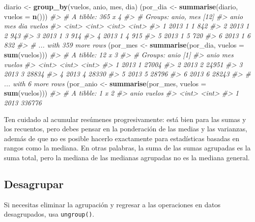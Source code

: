\documentclass[11pt,oneside]{report}
\newenvironment{Shaded}{\begin{snugshade}}{\end{snugshade}}
\newcommand{\CommentTok}[1]{\textcolor[rgb]{0.56,0.35,0.01}{\textit{#1}}}
\newcommand{\DataTypeTok}[1]{\textcolor[rgb]{0.13,0.29,0.53}{#1}}
\newcommand{\KeywordTok}[1]{\textcolor[rgb]{0.13,0.29,0.53}{\textbf{#1}}}
\newcommand{\NormalTok}[1]{#1}
\newcommand{\StringTok}[1]{\textcolor[rgb]{0.31,0.60,0.02}{#1}}
\begin{document}
\begin{Shaded}
\begin{Highlighting}[]
\NormalTok{diario <-}\StringTok{ }\KeywordTok{group_by}\NormalTok{(vuelos, anio, mes, dia)}
\NormalTok{(por_dia   <-}\StringTok{ }\KeywordTok{summarise}\NormalTok{(diario, }\DataTypeTok{vuelos =} \KeywordTok{n}\NormalTok{()))}
\CommentTok{#> # A tibble: 365 x 4}
\CommentTok{#> # Groups:   anio, mes [12]}
\CommentTok{#>    anio   mes   dia vuelos}
\CommentTok{#>   <int> <int> <int>  <int>}
\CommentTok{#> 1  2013     1     1    842}
\CommentTok{#> 2  2013     1     2    943}
\CommentTok{#> 3  2013     1     3    914}
\CommentTok{#> 4  2013     1     4    915}
\CommentTok{#> 5  2013     1     5    720}
\CommentTok{#> 6  2013     1     6    832}
\CommentTok{#> # ... with 359 more rows}
\NormalTok{(por_mes <-}\StringTok{ }\KeywordTok{summarise}\NormalTok{(por_dia, }\DataTypeTok{vuelos =} \KeywordTok{sum}\NormalTok{(vuelos)))}
\CommentTok{#> # A tibble: 12 x 3}
\CommentTok{#> # Groups:   anio [1]}
\CommentTok{#>    anio   mes vuelos}
\CommentTok{#>   <int> <int>  <int>}
\CommentTok{#> 1  2013     1  27004}
\CommentTok{#> 2  2013     2  24951}
\CommentTok{#> 3  2013     3  28834}
\CommentTok{#> 4  2013     4  28330}
\CommentTok{#> 5  2013     5  28796}
\CommentTok{#> 6  2013     6  28243}
\CommentTok{#> # ... with 6 more rows}
\NormalTok{(por_anio  <-}\StringTok{ }\KeywordTok{summarise}\NormalTok{(por_mes, }\DataTypeTok{vuelos =} \KeywordTok{sum}\NormalTok{(vuelos)))}
\CommentTok{#> # A tibble: 1 x 2}
\CommentTok{#>    anio vuelos}
\CommentTok{#>   <int>  <int>}
\CommentTok{#> 1  2013 336776}
\end{Highlighting}
\end{Shaded}

Ten cuidado al acumular resúmenes progresivamente: está bien para las
sumas y los recuentos, pero debes pensar en la ponderación de las medias
y las varianzas, además de que no es posible hacerlo exactamente para
estadísticas basadas en rangos como la mediana. En otras palabras, la
suma de las sumas agrupadas es la suma total, pero la mediana de las
medianas agrupadas no es la mediana general.

\hypertarget{desagrupar}{%
\subsection{Desagrupar}\label{desagrupar}}

Si necesitas eliminar la agrupación y regresar a las operaciones en
datos desagrupados, usa \texttt{ungroup()}.
\end{document}
